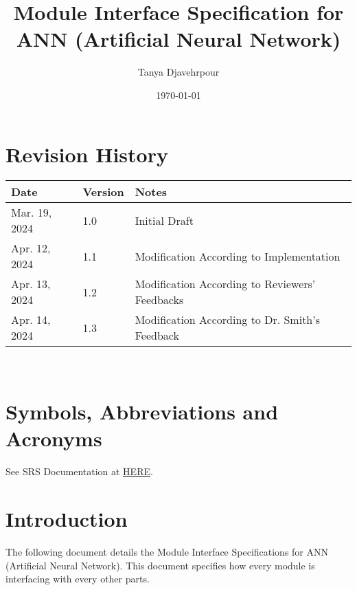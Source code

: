 \documentclass[12pt, titlepage]{article}
\begin{document}
\title{Module Interface Specification for ANN (Artificial Neural Network)}

\author{Tanya Djavehrpour}

\date{\today}

\maketitle


\section{Revision History}

\begin{tabularx}{\textwidth}{p{3cm}p{2cm}X}
\toprule {\bf Date} & {\bf Version} & {\bf Notes}\\
\midrule
Mar. 19, 2024 & 1.0 & Initial Draft\\
Apr. 12, 2024 & 1.1 & Modification According to Implementation\\
Apr. 13, 2024 & 1.2 & Modification According to Reviewers' Feedbacks\\
Apr. 14, 2024 & 1.3 & Modification According to Dr. Smith's Feedback\\
\bottomrule
\end{tabularx}

~\newpage

\section{Symbols, Abbreviations and Acronyms}

See SRS Documentation \cite{SRS} at 
\href{https://github.com/tanya-jp/ANN-CAS741/blob/main/docs/SRS/SRS.pdf}{HERE}.

\newpage

\tableofcontents

\newpage


\section{Introduction}

The following document details the Module Interface Specifications for
ANN (Artificial Neural Network). This document specifies how every module 
is interfacing with every other parts.
\end{document}
